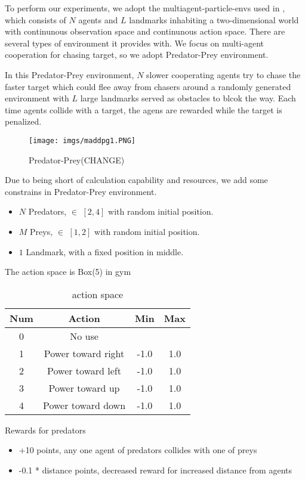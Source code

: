 \documentclass[11pt,twocolumn]{jarticle} %
\begin{document}
To perform our experiments, we adopt the multiagent-particle-envs used in \cite{maddpg}, which consists of $N$ agents and $L$ landmarks inhabiting a two-dimensional world with continunous observation space and continunous action space. There are several types of environment it provides with. We focus on multi-agent cooperation for chasing target, so we adopt Predator-Prey environment.\par
In this Predator-Prey environment, $N$ slower cooperating agents try to chase the faster target which could flee away from chasers around a randomly generated environment with $L$ large landmarks served as obstacles to blcok the way. Each time agents collide with a target, the agens are rewarded while the target is penalized. \par
\begin{figure}[t]
 \begin{center}
  \texttt{[image: imgs/maddpg1.PNG]}
  \caption{Predator-Prey(CHANGE)}
  \label{fig:adversaryChasing}
 \end{center}
\end{figure}
Due to being short of calculation capability and resources, we add some constrains in Predator-Prey environment.
\begin{itemize}
  \item $N$ Predators, $\in$ $[2, 4]$ with random initial position.
  \item $M$ Preys, $\in$ $[1, 2]$ with random initial position.
  \item $1$ Landmark, with a fixed position in middle.
\end{itemize}
The action space is Box(5) in gym \cite{gym}
\begin{table}[ht]
 \caption{action space} 
 \label{tbl:action}
  \begin{center}
    \begin{tabular}{c|ccc}
  Num  & Action & Min & Max\\
  \hline \hline
  0 & No use &  & \\
  1 & Power toward right & -1.0 & 1.0\\
  2 & Power toward left & -1.0 & 1.0\\
  3 & Power toward up & -1.0 & 1.0\\
  4 & Power toward down & -1.0 & 1.0\\\hline
    \end{tabular}
  \end{center}
\end{table}
Rewards for predators
\begin{itemize}
  \item +10 points, any one agent of predators collides with one of preys
  \item -0.1 * distance points, decreased reward for increased distance from agents
\end{itemize}
\end{document}
